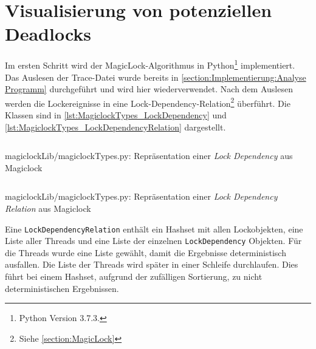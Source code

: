 \section{Visualisierung von potenziellen Deadlocks}
\label{section:Implementierung:Visualisierung von potenziellen Deadlocks}
Im ersten Schritt wird der MagicLock-Algorithmus in Python\footnote{Python
Version 3.7.3.} implementiert. Das Auslesen der Trace-Datei wurde bereits in
\cref{section:Implementierung:Analyse Programm} durchgeführt und wird hier
wiederverwendet. Nach dem Auslesen werden die Lockereignisse in eine
Lock-Dependency-Relation\footnote{Siehe \cref{section:MagicLock}} überführt. Die
Klassen sind in \cref{lst:MagiclockTypes_LockDependency} und
\cref{lst:MagiclockTypes_LockDependencyRelation} dargestellt.
\begin{listing}[ht]
  \inputminted[frame=lines,linenos,firstline=45,lastline=49]{python}{./Python/magiclockLib/magiclockTypes.py}
  \caption{magiclockLib/magiclockTypes.py: Repräsentation einer \emph{Lock Dependency} aus Magiclock\autocite[3]{MagicLock}}
  \label{lst:MagiclockTypes_LockDependency}
\end{listing}
\begin{listing}[ht]
  \inputminted[frame=lines,linenos,firstline=67,lastline=77]{python}{./Python/magiclockLib/magiclockTypes.py}
  \caption{magiclockLib/magiclockTypes.py: Repräsentation einer \emph{Lock Dependency Relation} aus Magiclock\autocite[3]{MagicLock}}
  \label{lst:MagiclockTypes_LockDependencyRelation}
\end{listing}
Eine \texttt{Lock\-Dependency\-Relation} enthält ein Hashset mit allen
Lockobjekten, eine Liste aller Threads und eine Liste der einzelnen
\texttt{Lock\-Dependency} Objekten. Für die Threads wurde eine Liste gewählt,
damit die Ergebnisse deterministisch ausfallen. Die Liste der Threads wird
später in einer Schleife durchlaufen. Dies führt bei einem Hashset, aufgrund der
zufälligen Sortierung, zu nicht deterministischen Ergebnissen.

